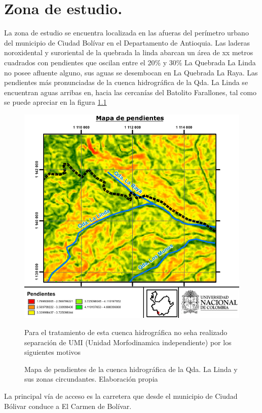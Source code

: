 \chapter{Zona de estudio.}
La zona de estudio se encuentra localizada en las afueras del per\'imetro urbano del municipio de Ciudad Bol\'ivar en el Departamento de Antioquia. 
Las laderas noroxidental y suroriental de la quebrada la linda abarcan un \'area de xx metros cuadrados con pendientes que oscilan entre el 20\% y 30\%
 La Quebrada La Linda no posee afluente alguno, sus aguas se desembocan en La Quebrada La Raya.
Las pendientes m\'as pronunciadas de la cuenca hidrogr\'afica de la Qda. La Linda se encuentran aguas arribas en, hacia las cercan\'ias del Batolito Farallones, tal como se puede apreciar en la figura \ref{fig:slopes}

\begin{figure}[H]
\centering
\includegraphics[scale=1]{img/pendientes.pdf}
\caption{Mapa de pendientes de la cuenca hidrogr\'afica de la Qda. La Linda y sus zonas circundantes. Elaboraci\'on propia}

Para el tratamiento de esta cuenca hidrogr\'afica no seha realizado separaci\'on de UMI (Unidad Morfodinamica independiente) por los siguientes motivos
\label{fig:slopes}
\end{figure}
La principal v\'ia de acceso es la carretera que desde el municipio de Ciudad B\'olivar conduce a El Carmen de Bol\'ivar.